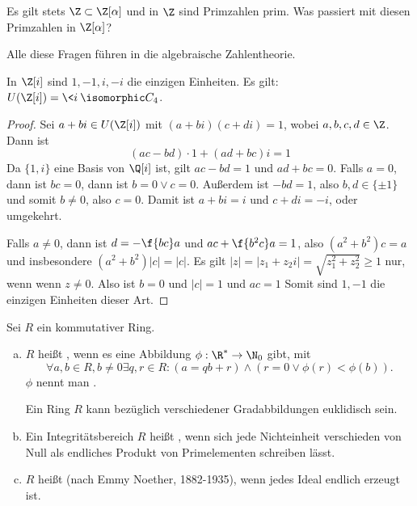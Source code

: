 Es gilt stets $\Z \subset \Z[\alpha]$ und in $\Z$ sind Primzahlen prim.
Was passiert mit diesen Primzahlen in $\Z[\alpha]$?

Alle diese Fragen führen in die algebraische Zahlentheorie.

\begin{lem} \label{4.4}
	In $\Z[i]$ sind $1, -1, i, -i$ die einzigen Einheiten.
	Es gilt: $U(\Z[i]) = \< i \> \isomorphic C_4$.
	\begin{proof}
		Sei $a + bi \in U(\Z[i])$ mit
		$(a + bi)(c + di) = 1$, wobei $a, b, c, d \in \Z$.
		Dann ist
		\[
			(ac - bd)\cdot 1 + (ad + bc) i = 1
		\]
		Da $\{1, i\}$ eine Basis von $\Q[i]$ ist, gilt $ac - bd = 1$ und $ad +  bc = 0$.
		Falls $a = 0$, dann ist $bc = 0$, dann ist $b = 0 \lor c = 0$.
		Außerdem ist $-bd = 1$, also $b,d \in \{\pm 1\}$ und somit $b \neq 0$, also $c = 0$.
		Damit ist $a + bi = i$ und $c + di = -i$, oder umgekehrt.

		Falls $a \neq 0$, dann ist $d = - \f{bc}a$ und $ac + \f{b^2 c}a = 1$, also $(a^2 + b^2)c = a$ und insbesondere $(a^2 + b^2)|c| = |c|$.
		Es gilt $|z| = |z_1 + z_2 i| = \sqrt{z_1^2 + z_2^2} \ge 1$ nur, wenn wenn $z \neq 0$.
		Also ist $b = 0$ und $|c| = 1$ und $ac = 1$
		Somit sind $1, -1$ die einzigen Einheiten dieser Art.
	\end{proof}
\end{lem}

\begin{df} \label{4.5}
	Sei $R$ ein kommutativer Ring.
	\begin{enumerate}[a)]
		\item
			$R$ heißt , wenn es eine Abbildung $\phi: \R^* \to \N_0$ gibt, mit
			\[
				\forall a, b \in R, b \neq 0 \exists q,r \in R : (a = qb + r) \land (r = 0 \lor \phi(r) < \phi(b)).
			\]
			$\phi$ nennt man .
			\begin{note}
				Ein Ring $R$ kann bezüglich verschiedener Gradabbildungen euklidisch sein.
			\end{note}
		\item
			Ein Integritätsbereich $R$ heißt , wenn sich jede Nichteinheit verschieden von Null als endliches Produkt von Primelementen schreiben lässt.
		\item
			$R$ heißt  (nach Emmy Noether, 1882-1935), wenn jedes Ideal endlich erzeugt ist.
	\end{enumerate}
\end{df}

